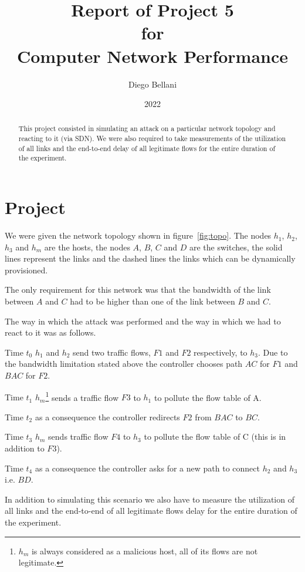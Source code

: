 \documentclass[twocolumn]{article}
\author{Diego Bellani}
\date{2022}
\title{Report of Project 5\protect\\ for\protect\\ Computer Network Performance}
\begin{document}
\maketitle

\begin{abstract}
This project consisted in simulating an attack on a particular network topology
and reacting to it (via SDN). We were also required to take measurements of the
utilization of all links and the end-to-end delay of all legitimate flows for
the entire duration of the experiment.
\end{abstract}

\section{Project}
We were given the network topology shown in figure~\ref{fig:topo}. The nodes
$h_1$, $h_2$, $h_3$ and $h_m$ are the hosts, the nodes $A$, $B$, $C$ and $D$ are
the switches, the solid lines represent the links and the dashed lines the links
which can be dynamically provisioned.

The only requirement for this network was that the bandwidth of the link between
$A$ and $C$ had to be higher than one of the link between $B$ and $C$.

The way in which the attack was performed and the way in which we had to react
to it was as follows.
%
\begin{description}
\item{Time $t_0$} $h_1$ and $h_2$ send two traffic flows, $F1$ and $F2$
respectively, to $h_3$. Due to the bandwidth limitation stated above the
controller chooses path $AC$ for $F1$ and $BAC$ for $F2$.
\item{Time $t_1$} $h_m$\footnote{$h_m$ is always considered as a malicious host,
all of its flows are not legitimate.} sends a traffic flow $F3$ to $h_1$ to
pollute the flow table of A.
\item{Time $t_2$} as a consequence the controller redirects $F2$ from $BAC$ to
$BC$.
\item{Time $t_3$} $h_m$ sends traffic flow $F4$ to $h_3$ to pollute the flow
table of C (this is in addition to $F3$).
\item{Time $t_4$} as a consequence the controller asks for a new path to connect
$h_2$ and $h_3$ i.e. $BD$.
\end{description}

In addition to simulating this scenario we also have to measure the utilization
of all links and the end-to-end of all legitimate flows delay for the entire
duration of the experiment.
\end{document}
